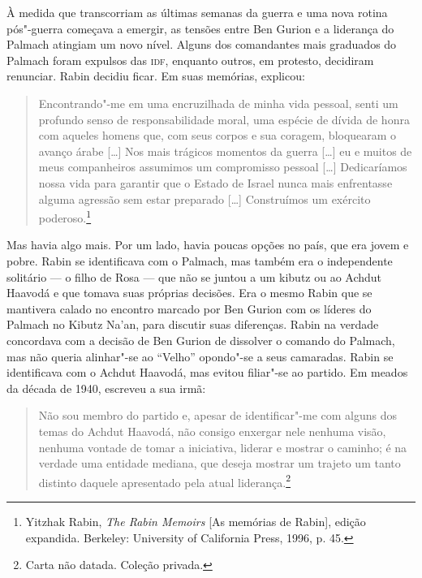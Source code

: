 À medida que transcorriam as últimas semanas da guerra e uma nova rotina
pós"-guerra começava a emergir, as tensões entre Ben Gurion e a liderança
do Palmach atingiam um novo nível. Alguns dos comandantes mais graduados
do Palmach foram expulsos das \textsc{idf}, enquanto outros, em protesto,
decidiram renunciar. Rabin decidiu ficar. Em suas memórias, explicou:

\begin{quote}
Encontrando"-me em uma encruzilhada de minha vida pessoal, senti um
profundo senso de responsabilidade moral, uma espécie de dívida de honra
com aqueles homens que, com seus corpos e sua coragem, bloquearam o
avanço árabe {[}\ldots{}{]} Nos mais trágicos momentos da guerra {[}\ldots{}{]} eu e muitos de
meus companheiros assumimos um compromisso pessoal {[}\ldots{}{]} Dedicaríamos nossa
vida para garantir que o Estado de Israel nunca mais enfrentasse alguma
agressão sem estar preparado {[}\ldots{}{]} Construímos um exército
poderoso.\footnote{Yitzhak Rabin, \textit{The Rabin Memoirs} {[}As memórias de Rabin{]}, edição expandida. Berkeley:
University of California Press, 1996, p. 45.}
\end{quote}

Mas havia algo mais. Por um lado, havia poucas opções no país, que era
jovem e pobre. Rabin se identificava com o Palmach, mas também era o
independente solitário --- o filho de Rosa --- que não se juntou a um
kibutz ou ao Achdut Haavodá e que tomava suas próprias decisões. Era o
mesmo Rabin que se mantivera calado no encontro marcado por Ben
Gurion com os líderes do Palmach no Kibutz Na'an, para discutir suas
diferenças. Rabin na verdade concordava com a decisão de Ben Gurion de
dissolver o comando do Palmach, mas não queria alinhar"-se ao ``Velho''
opondo"-se a seus camaradas. Rabin se identificava com o Achdut Haavodá,
mas evitou filiar"-se ao partido. Em meados da década de 1940, escreveu a
sua irmã: 

\begin{quote}
Não sou membro do partido e, apesar de identificar"-me com
alguns dos temas do Achdut Haavodá, não consigo enxergar nele nenhuma
visão, nenhuma vontade de tomar a iniciativa, liderar e mostrar o
caminho; é na verdade uma entidade mediana, que deseja mostrar um
trajeto um tanto distinto daquele apresentado pela atual
liderança.\footnote{Carta não datada. Coleção privada.}
\end{quote}

